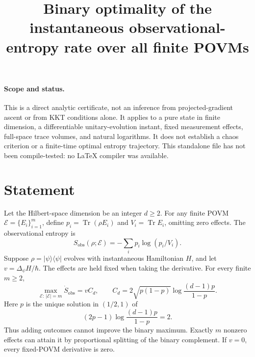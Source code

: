 \documentclass[11pt,a4paper]{article}
\title{Binary optimality of the instantaneous observational-entropy rate over all finite POVMs}
\author{}
\date{}
\newcommand{\Tr}{\operatorname{Tr}}
\begin{document}
\maketitle
\paragraph{Scope and status.} This is a direct analytic certificate, not an inference from projected-gradient ascent or from KKT conditions alone. It applies to a pure state in finite dimension, a differentiable unitary-evolution instant, fixed measurement effects, full-space trace volumes, and natural logarithms. It does not establish a chaos criterion or a finite-time optimal entropy trajectory. This standalone file has not been compile-tested: no LaTeX compiler was available.
\section*{Statement}
Let the Hilbert-space dimension be an integer $d\ge2$. For any finite POVM $\mathcal E=\{E_i\}_{i=1}^m$, define $p_i=\Tr(\rho E_i)$ and $V_i=\Tr E_i$, omitting zero effects. The observational entropy is
\[S_{\mathrm{obs}}(\rho;\mathcal E)=-\sum_i p_i\log(p_i/V_i).\]
Suppose $\rho=|\psi\rangle\langle\psi|$ evolves with instantaneous Hamiltonian $H$, and let $v=\Delta_\psi H/\hbar$. The effects are held fixed when taking the derivative. For every finite $m\ge2$,
\[\max_{\mathcal E:\,|\mathcal E|=m}\dot S_{\mathrm{obs}}=vC_d,\qquad C_d=2\sqrt{p(1-p)}\log\frac{(d-1)p}{1-p}.\]
Here $p$ is the unique solution in $(1/2,1)$ of
\[(2p-1)\log\frac{(d-1)p}{1-p}=2.\]
Thus adding outcomes cannot improve the binary maximum. Exactly $m$ nonzero effects can attain it by proportional splitting of the binary complement. If $v=0$, every fixed-POVM derivative is zero.
\end{document}
